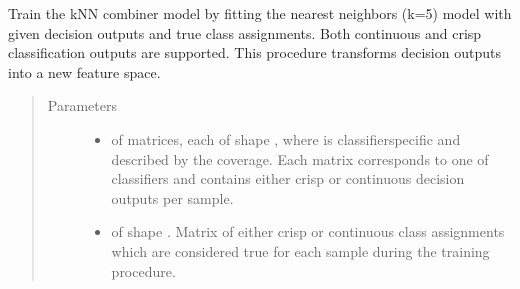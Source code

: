 \documentclass[letterpaper,10pt,english]{sphinxmanual}
\begin{document}
\begin{fulllineitems}
\begin{fulllineitems}
\label{\detokenize{pusion.core.k_nearest_neighbors_combiner:pusion.core.k_nearest_neighbors_combiner.CRKNNCombiner.train}}
\sphinxAtStartPar
Train the kNN combiner model by fitting the  nearest neighbors (k=5) model with given decision outputs and
true class assignments. Both continuous and crisp classification outputs are supported.
This procedure transforms decision outputs into a new feature space.
\begin{quote}\begin{description}
\item[{Parameters}] \leavevmode\begin{itemize}
\item {} 
\sphinxAtStartPar
{} \textendash{}  of  matrices, each of shape ,
where  is classifier\sphinxhyphen{}specific and described by the coverage.
Each matrix corresponds to one of  classifiers and contains either crisp or continuous
decision outputs per sample.

\item {} 
\sphinxAtStartPar
{} \textendash{}  of shape .
Matrix of either crisp or continuous class assignments which are considered true for each sample during
the training procedure.

\end{itemize}

\end{description}\end{quote}

\end{fulllineitems}



\end{fulllineitems}
\end{document}
